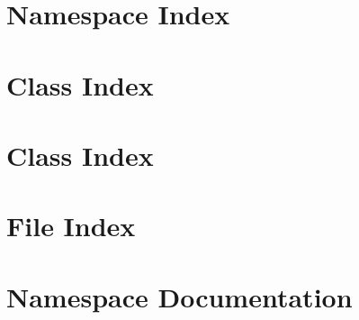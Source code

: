 \documentclass[a4paper]{article}
\begin{document}
\section{Namespace Index}

\section{Class Index}

\section{Class Index}

\section{File Index}

\section{Namespace Documentation}






\end{document}
